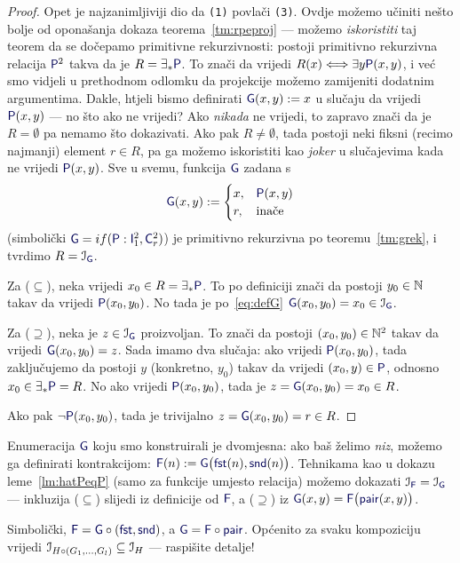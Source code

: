 \begin{proof}
Opet je najzanimljiviji dio da \texttt{(1)} povlači \texttt{(3)}. %
Ovdje možemo učiniti nešto bolje od oponašanja dokaza teorema~\ref{tm:rpeproj} --- možemo \emph{iskoristiti} taj teorem da se dočepamo primitivne rekurzivnosti: postoji primitivno rekurzivna relacija $\f P^2$ takva da je $R=\exists_*\f P$. To znači da vrijedi $R(x)\Longleftrightarrow\exists y\f P(x,y)$, i već smo vidjeli u prethodnom odlomku da projekcije možemo zamijeniti dodatnim argumentima. Dakle, htjeli bismo definirati $\f G(x,y):=x$ u slučaju da vrijedi $\f P(x,y)$ --- no što ako ne vrijedi? Ako \emph{nikada} ne vrijedi, to zapravo znači da je $R=\emptyset$ pa nemamo što dokazivati. Ako pak $R\ne\emptyset$, tada postoji neki fiksni (recimo najmanji) element $r\in R$, pa ga možemo iskoristiti kao \emph{joker} u slučajevima kada ne vrijedi $\f P(x,y)$. Sve u svemu, funkcija $\f G$ zadana s
\begin{equation}\label{eq:defG}
    \f G(x,y):=\begin{cases}
        x,&\f P(x,y)\\
        r,&\text{inače}
    \end{cases}
\end{equation}
(simbolički $\f G=\IF{\f P:\f I_1^2,\f C_r^2}$) je primitivno rekurzivna po teoremu~\ref{tm:grek}, i tvrdimo $R=\im{\f G}$.

Za ($\subseteq$), neka vrijedi $x_0\in R=\exists_*\f P$. To po definiciji znači da postoji $y_0\in{\mathbb N}$ takav da vrijedi $\f P(x_0,y_0)$. No tada je po~\eqref{eq:defG} $\f G(x_0,y_0)=x_0\in\im{\f G}$.

Za ($\supseteq$), neka je $z\in\im{\f G}$ proizvoljan. To znači da postoji $(x_0,y_0)\in{\mathbb N}^2$ takav da vrijedi $\f G(x_0,y_0)=z$. Sada imamo dva slučaja: ako vrijedi $\f P(x_0,y_0)$, tada zaključujemo da postoji $y$ (konkretno, $y_0$) takav da vrijedi $(x_0,y)\in\f P$, odnosno $x_0\in\exists_*\f P=R$. No ako vrijedi $\f P(x_0,y_0)$, tada je $z=\f G(x_0,y_0)=x_0\in R$.

Ako pak $\lnot\f P(x_0,y_0)$, tada je trivijalno $z=\f G(x_0,y_0)=r\in R$.
\end{proof}

\begin{napomena}[{name=[enumeracija kao jednomjesna funkcija --- niz]}]
Enumeracija $\f G$ koju smo konstruirali je dvomjesna: ako baš želimo \emph{niz}, možemo ga definirati kontrakcijom: $\f F(n):=\f G\bigl(\f{fst}(n),\f{snd}(n)\bigr)$. Tehnikama kao u dokazu leme~\ref{lm:hatPeqP} (samo za funkcije umjesto relacija) možemo dokazati $\im{\f F}=\im{\f G}$ --- inkluzija ($\subseteq$) slijedi iz definicije od $\f F$, a ($\supseteq$) iz $\f G(x,y)=\f F\bigl(\f{pair}(x,y)\bigr)$.

Simbolički, $\f F=\f G\circ(\f{fst},\f{snd})$, a $\f G=\f F\circ\f{pair}$. Općenito za svaku kompoziciju vrijedi $\mathcal I_{H\circ(G_1,\dotsc,G_l)}\subseteq\mathcal I_{H}$ --- raspišite detalje!
\end{napomena}

